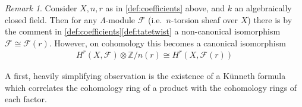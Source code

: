 \documentclass[english]{scrartcl}
\theoremstyle{definition}
\theoremstyle{remark}
\newtheorem{Rem}[Def]{Remark}
\newcommand*{\Z}{\mathds{Z}}
\newcommand*{\Zmod}[1]{\Z/#1} %
\newcommand*{\F}{\mathcal{F}} %
\newcommand*{\idest}{i.e.\ }
\begin{document}
\begin{Rem}\label{cohomologyoftwists}
  Consider $X,n,r$ as in \ref{def:coefficients} above, and $k$ an
  algebraically closed field. Then for any $\Lambda$-module $\F$
  (\idest $n$-torsion sheaf over $X$) there is by the comment in
  \ref{def:coefficients}\ref{def:tatetwist} a non-canonical
  isomorphism $\F\cong\F(r)$. However, on cohomology this becomes a
  canonical isomorphism
  \cite[see][p.\,66 and p.\,163]{milnebook}
  \begin{gather*}
    H^r(X,\F)\otimes \Zmod{n}(r) \cong H^r(X,\F(r))
  \end{gather*}
\end{Rem}


A first, heavily simplifying observation is the existence of a Künneth
formula which correlates the cohomology ring of a product with the
cohomology rings of each factor.
\end{document}
